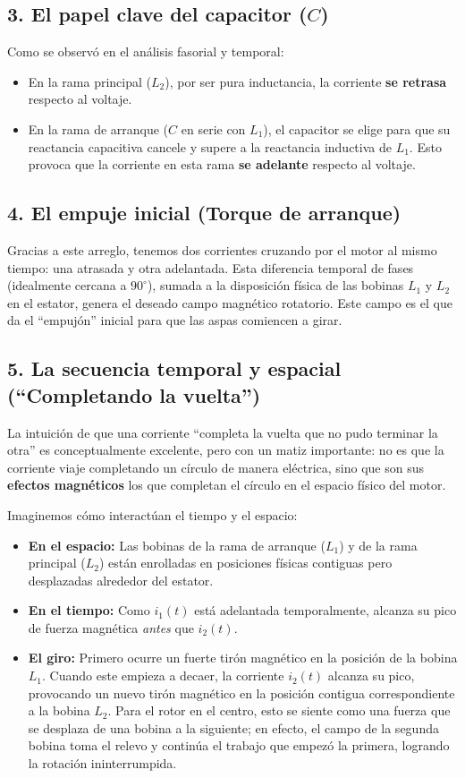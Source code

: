 \documentclass[12pt, a4paper]{article}
\begin{document}
\subsection*{3. El papel clave del capacitor ($C$)}
Como se observó en el análisis fasorial y temporal:
\begin{itemize}
    \item En la rama principal ($L_2$), por ser pura inductancia, la corriente \textbf{se retrasa} respecto al voltaje.
    \item En la rama de arranque ($C$ en serie con $L_1$), el capacitor se elige para que su reactancia capacitiva cancele y supere a la reactancia inductiva de $L_1$. Esto provoca que la corriente en esta rama \textbf{se adelante} respecto al voltaje.
\end{itemize}

\subsection*{4. El empuje inicial (Torque de arranque)}
Gracias a este arreglo, tenemos dos corrientes cruzando por el motor al mismo tiempo: una atrasada y otra adelantada. Esta diferencia temporal de fases (idealmente cercana a $90^\circ$), sumada a la disposición física de las bobinas $L_1$ y $L_2$ en el estator, genera el deseado campo magnético rotatorio. Este campo es el que da el ``empujón'' inicial para que las aspas comiencen a girar.

\subsection*{5. La secuencia temporal y espacial (``Completando la vuelta'')}
La intuición de que una corriente ``completa la vuelta que no pudo terminar la otra'' es conceptualmente excelente, pero con un matiz importante: no es que la corriente viaje completando un círculo de manera eléctrica, sino que son sus \textbf{efectos magnéticos} los que completan el círculo en el espacio físico del motor.

Imaginemos cómo interactúan el tiempo y el espacio:
\begin{itemize}
    \item \textbf{En el espacio:} Las bobinas de la rama de arranque ($L_1$) y de la rama principal ($L_2$) están enrolladas en posiciones físicas contiguas pero desplazadas alrededor del estator.
    \item \textbf{En el tiempo:} Como $i_1(t)$ está adelantada temporalmente, alcanza su pico de fuerza magnética \textit{antes} que $i_2(t)$.
    \item \textbf{El giro:} Primero ocurre un fuerte tirón magnético en la posición de la bobina $L_1$. Cuando este empieza a decaer, la corriente $i_2(t)$ alcanza su pico, provocando un nuevo tirón magnético en la posición contigua correspondiente a la bobina $L_2$. Para el rotor en el centro, esto se siente como una fuerza que se desplaza de una bobina a la siguiente; en efecto, el campo de la segunda bobina toma el relevo y continúa el trabajo que empezó la primera, logrando la rotación ininterrumpida.
\end{itemize}
\end{document}

